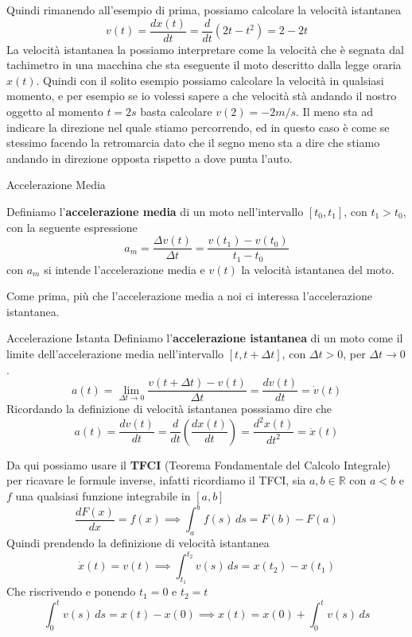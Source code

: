 \documentclass{rapport}
\begin{document}
Quindi rimanendo all'esempio di prima, possiamo calcolare la velocità istantanea
\[
v(t) = \dfrac{d x(t)}{dt} = \dfrac{d}{dt} \left(2t-t^2\right) = 2-2t
\]
La velocità istantanea la possiamo interpretare come la velocità che è segnata dal tachimetro in una macchina che sta eseguente il moto descritto dalla legge oraria $x(t)$. Quindi con il solito esempio possiamo calcolare la velocità in qualsiasi momento, e per esempio se io volessi sapere a che velocità stà andando il nostro oggetto al momento $t=2s$ basta calcolare $v(2) =  -2m/s$. Il meno sta ad indicare la direzione nel quale stiamo percorrendo, ed in questo caso è come se stessimo facendo la retromarcia dato che il segno meno sta a dire che stiamo andando in direzione opposta rispetto a dove punta l'auto.


\begin{definizione}{Accelerazione Media}{}

  Definiamo l'\textbf{accelerazione media} di un moto nell'intervallo $[t_0, t_1]$, con $t_1 > t_0$, con la seguente espressione 
  \begin{equation*}
    a_m = \dfrac{\Delta v(t)}{\Delta t} = \dfrac{v(t_1) - v(t_0)}{t_1-t_0}
  \end{equation*}
  con $a_m$ si intende l'accelerazione media e $v(t)$ la velocità istantanea del moto.
\end{definizione}

Come prima, più che l'accelerazione media a noi ci interessa l'accelerazione istantanea.

\begin{definizione}{Accelerazione Istanta}{}
  Definiamo l'\textbf{accelerazione istantanea} di un moto come il limite dell'accelerazione media nell'intervallo $[t, t + \Delta t]$, con $\Delta t>0$, per $\Delta t \to 0$.
  \[
  a(t) = \lim_{\Delta t \to 0} \dfrac{v(t+\Delta t)-v(t)}{\Delta t} = \dfrac{d v(t)}{dt}=\dot{v}(t)
  \]
  Ricordando la definizione di velocità istantanea posssiamo dire che
  \[
  a(t) = \dfrac{d v(t)}{dt} = \dfrac{d}{dt}\left(\dfrac{d x(t)}{dt}\right) = \dfrac{d^2 x(t)}{dt^2} = \ddot{x}(t)
  \]
\end{definizione}

Da qui possiamo usare il \textbf{TFCI} (Teorema Fondamentale del Calcolo Integrale) per ricavare le formule inverse, infatti ricordiamo il  TFCI, sia $a,b \in \mathbb{R}$ con $a<b$ e $f$ una qualsiasi funzione integrabile in $[a,b]$
\[
\dfrac{d F(x)}{dx} = f(x) \implies \int_{a}^{b} f(s)\,ds =  F(b) - F(a)
\]
Quindi prendendo la definizione di velocità istantanea
\[
\dot{x}(t) = v(t) \implies \int_{t_1}^{t_2} v(s) \,ds = x(t_2) - x(t_1)
\]
Che riscrivendo e ponendo $t_1 = 0$ e $t_2 = t$
\begin{equation}
  \label{eq:spazio1}
  \int_{0}^{t} v(s) \,ds = x(t) - x(0) \implies x(t) = x(0) + \int_{0}^{t} v(s) \,ds 
\end{equation}
\end{document}
